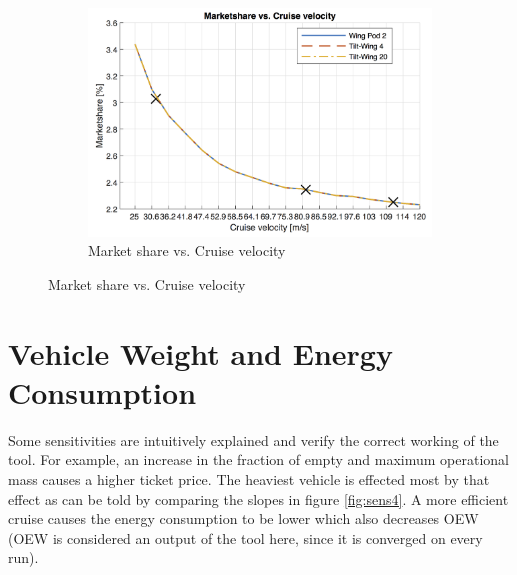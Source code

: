 \begin{figure}[h]
\begin{subfigure}[t]{0.33\textwidth}
    \includegraphics[width=\textwidth]{Figures/cruise_marketshare.png}
    \captionsetup{justification=centering}
    \caption{Market share vs. Cruise velocity}
    \label{fig:sens9}
\end{subfigure}
\captionsetup{justification=centering}
\end{figure}

\section{Vehicle Weight and Energy Consumption}
Some sensitivities are intuitively explained and verify the correct working of the tool. For example, an increase in the fraction of empty and maximum operational mass causes a higher ticket price. The heaviest vehicle is effected most by that effect as can be told by comparing the slopes in figure \ref{fig:sens4}. A more efficient cruise causes the energy consumption to be lower which also decreases OEW (OEW is considered an output of the tool here, since it is converged on every run). 

